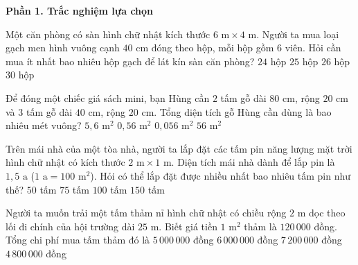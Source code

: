 \textbf{Phần 1. Trắc nghiệm lựa chọn}

\begin{ex} %
Một căn phòng có sàn hình chữ nhật kích thước $6\text{ m} \times 4\text{ m}$. Người ta mua loại gạch men hình vuông cạnh $40\text{ cm}$ đóng theo hộp, mỗi hộp gồm $6$ viên. Hỏi cần mua ít nhất bao nhiêu hộp gạch để lát kín sàn căn phòng?
\choice
{$24$ hộp}
{\True $25$ hộp}
{$26$ hộp}
{$30$ hộp}
\end{ex}

\begin{ex} %
Để đóng một chiếc giá sách mini, bạn Hùng cần $2$ tấm gỗ dài $80\text{ cm}$, rộng $20\text{ cm}$ và $3$ tấm gỗ dài $40\text{ cm}$, rộng $20\text{ cm}$. Tổng diện tích gỗ Hùng cần dùng là bao nhiêu mét vuông?
\choice
{$5{,}6\text{ m}^2$}
{\True $0{,}56\text{ m}^2$}
{$0{,}056\text{ m}^2$}
{$56\text{ m}^2$}
\end{ex}

\begin{ex} %
Trên mái nhà của một tòa nhà, người ta lắp đặt các tấm pin năng lượng mặt trời hình chữ nhật có kích thước $2\text{ m} \times 1\text{ m}$. Diện tích mái nhà dành để lắp pin là $1{,}5\text{ a}$ ($1\text{ a} = 100\text{ m}^2$). Hỏi có thể lắp đặt được nhiều nhất bao nhiêu tấm pin như thế?
\choice
{$50$ tấm}
{\True $75$ tấm}
{$100$ tấm}
{$150$ tấm}
\end{ex}

\begin{ex} %
Người ta muốn trải một tấm thảm nỉ hình chữ nhật có chiều rộng $2\text{ m}$ dọc theo lối đi chính của hội trường dài $25\text{ m}$. Biết giá tiền $1\text{ m}^2$ thảm là $120\,000$ đồng. Tổng chi phí mua tấm thảm đó là
\choice
{$5\,000\,000$ đồng}
{\True $6\,000\,000$ đồng}
{$7\,200\,000$ đồng}
{$4\,800\,000$ đồng}
\end{ex}

